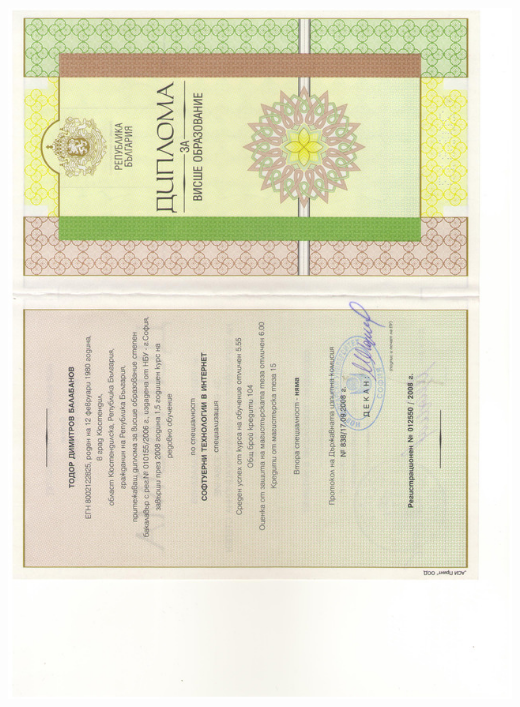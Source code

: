 \documentclass[english,a4paper]{europasscv}
\begin{document}
\includegraphics[width=\textwidth,height=\textheight,keepaspectratio]{DiplomaNBU2008_1}
\end{document}
